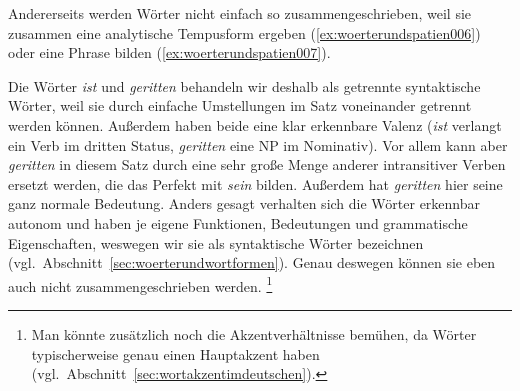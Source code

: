 Andererseits werden Wörter nicht einfach so zusammengeschrieben, \zB weil sie zusammen eine analytische Tempusform ergeben (\ref{ex:woerterundspatien006}) oder eine Phrase bilden (\ref{ex:woerterundspatien007}).

\begin{exe}
  \ex\label{ex:woerterundspatien005}
  \begin{xlist}
  \end{xlist}
\end{exe}

Die Wörter \textit{ist} und \textit{geritten} behandeln wir \zB deshalb als getrennte syntaktische Wörter, weil sie durch einfache Umstellungen im Satz voneinander getrennt werden können.
Außerdem haben beide eine klar erkennbare Valenz (\textit{ist} verlangt ein Verb im dritten Status, \textit{geritten} eine NP im Nominativ).
Vor allem kann aber \textit{geritten} in diesem Satz durch eine sehr große Menge anderer intransitiver Verben ersetzt werden, die das Perfekt mit \textit{sein} bilden.
Außerdem hat \textit{geritten} hier seine ganz normale Bedeutung.
Anders gesagt verhalten sich die Wörter erkennbar autonom und haben je eigene Funktionen, Bedeutungen und grammatische Eigenschaften, weswegen wir sie als syntaktische Wörter bezeichnen (vgl.\ Abschnitt~\ref{sec:woerterundwortformen}).
Genau deswegen können sie eben auch nicht zusammengeschrieben werden.%
\footnote{Man könnte zusätzlich noch die Akzentverhältnisse bemühen, da Wörter typischerweise genau einen Hauptakzent haben (vgl.\ Abschnitt~\ref{sec:wortakzentimdeutschen}).}

